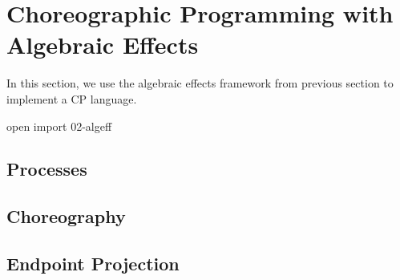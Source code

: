 \section{Choreographic Programming with Algebraic Effects}

In this section, we use the algebraic effects framework from previous section to implement a CP language.

\begin{code}[hide]
open import 02-algeff
\end{code}

\subsection{Processes}

\subsection{Choreography}

\subsection{Endpoint Projection}
